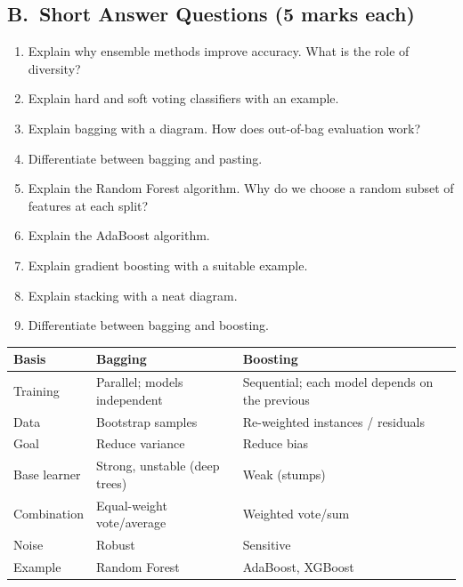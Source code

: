 \subsection*{B.\ Short Answer Questions (5 marks each)}
\begin{enumerate}
  \item Explain why ensemble methods improve accuracy. What is the role of diversity? 
  \item Explain hard and soft voting classifiers with an example. 
  \item Explain bagging with a diagram. How does out-of-bag evaluation work? 
  \item Differentiate between bagging and pasting. 
  \item Explain the Random Forest algorithm. Why do we choose a random subset of features at each split? 
  \item Explain the AdaBoost algorithm. 
  \item Explain gradient boosting with a suitable example. 
  \item Explain stacking with a neat diagram. 
  \item Differentiate between bagging and boosting. 
\end{enumerate}

\begin{modelans}
\begin{center}\small
\begin{tabular}{@{}p{2.6cm}p{5.2cm}p{5.2cm}@{}}
\toprule
\textbf{Basis} & \textbf{Bagging} & \textbf{Boosting}\\
\midrule
Training & Parallel; models independent & Sequential; each model depends on the previous\\
Data & Bootstrap samples & Re-weighted instances / residuals\\
Goal & Reduce variance & Reduce bias\\
Base learner & Strong, unstable (deep trees) & Weak (stumps)\\
Combination & Equal-weight vote/average & Weighted vote/sum\\
Noise & Robust & Sensitive\\
Example & Random Forest & AdaBoost, XGBoost\\
\bottomrule
\end{tabular}
\end{center}
\end{modelans}

